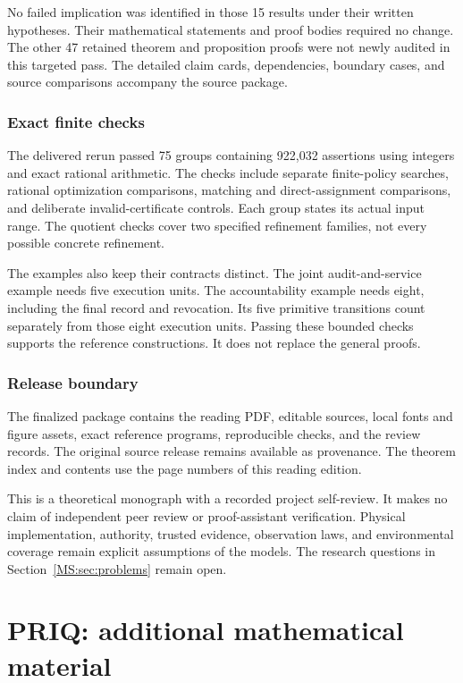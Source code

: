 \documentclass[11pt,oneside,openany]{book}
\numberwithin{equation}{section}
\begin{document}
No failed implication was identified in those 15 results under their written hypotheses. Their mathematical statements and proof bodies required no change. The other 47 retained theorem and proposition proofs were not newly audited in this targeted pass. The detailed claim cards, dependencies, boundary cases, and source comparisons accompany the source package.

\subsection*{Exact finite checks}
The delivered rerun passed 75 groups containing 922,032 assertions using integers and exact rational arithmetic. The checks include separate finite-policy searches, rational optimization comparisons, matching and direct-assignment comparisons, and deliberate invalid-certificate controls. Each group states its actual input range. The quotient checks cover two specified refinement families, not every possible concrete refinement.

The examples also keep their contracts distinct. The joint audit-and-service example needs five execution units. The accountability example needs eight, including the final record and revocation. Its five primitive transitions count separately from those eight execution units. Passing these bounded checks supports the reference constructions. It does not replace the general proofs.

\subsection*{Release boundary}
The finalized package contains the reading PDF, editable sources, local fonts and figure assets, exact reference programs, reproducible checks, and the review records. The original source release remains available as provenance. The theorem index and contents use the page numbers of this reading edition.

This is a theoretical monograph with a recorded project self-review. It makes no claim of independent peer review or proof-assistant verification. Physical implementation, authority, trusted evidence, observation laws, and environmental coverage remain explicit assumptions of the models. The research questions in Section~\ref{MS:sec:problems} remain open.




\chapter{PRIQ: additional mathematical material}
\setcounter{section}{0}
\end{document}
